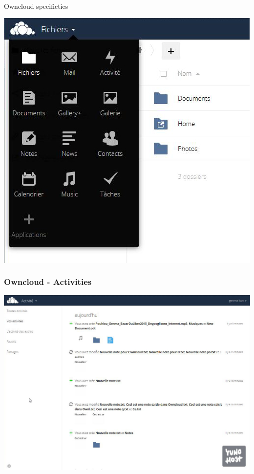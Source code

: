 \documentclass{beamer}
\begin{document}
\begin{frame}
\Huge{\centerline{Owncloud specificties}}
\begin{center}
\includegraphics[scale=0.38] {./Owncloud/OwnCloud_Liste_applications.jpg}
\end{center}
\end{frame}

\begin{frame}
\frametitle{Owncloud - Activities}
\includegraphics[scale=0.3] {./Owncloud/Owncloud_Activites.jpg}
\end{frame}
\end{document}
